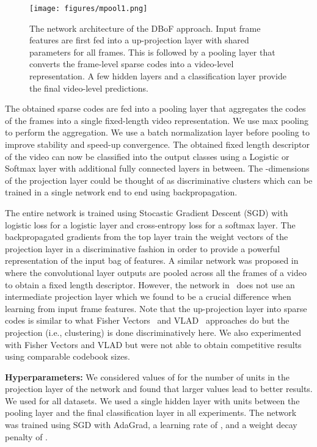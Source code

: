 \documentclass{sig-alternate-05-2015}
\begin{document}
\begin{figure}
\begin{center}
  \texttt{[image: figures/mpool1.png]}
  \caption{\small The network architecture of the DBoF approach. Input frame
  features are first fed into a up-projection layer with shared parameters for
  all frames. This is followed by a pooling layer that converts the frame-level
  sparse codes into a video-level representation. A few hidden layers and a
  classification layer provide the final video-level predictions.}
\label{fig:mpool}
\end{center}
\end{figure}

The obtained sparse codes are fed into a pooling layer that aggregates the codes
of the  frames into a single fixed-length video representation. We use max
pooling to perform the aggregation. We use a batch normalization layer before
pooling to improve stability and speed-up convergence. The obtained fixed length
descriptor of the video can now be classified into the output classes using a
Logistic or Softmax layer with additional fully connected layers in between. The
-dimensions of the projection layer could be thought of as  discriminative
clusters which can be trained in a single network end to end using backpropagation.

The entire network is trained using Stocastic Gradient Descent (SGD) with logistic loss for a logistic layer and cross-entropy loss for a softmax layer. The
backpropagated gradients from the top layer train the weight vectors of the projection layer in a discriminative fashion in order to provide a powerful
representation of the input bag of features. A similar network was proposed in~\cite{beyond} where the convolutional layer outputs are pooled across all the
frames of a video to obtain a fixed length descriptor. However, the network in~\cite{beyond} does not use an intermediate projection layer which we found
to be a crucial difference when learning from input frame features.
Note that the up-projection layer into sparse codes is similar to what Fisher
Vectors~\cite{fisher1} and VLAD~\cite{vlad} approaches do but the projection
(i.e., clustering) is done discriminatively here. We also experimented with
Fisher Vectors and VLAD but were not able to obtain competitive results using
comparable codebook sizes.

\textbf{Hyperparameters:} We considered values of  for the
number of units in the projection layer of the network and found that larger
values lead to better results. We used  for all datasets. We used a single
hidden layer with  units between the pooling layer and the final classification
layer in all experiments. The network was trained using SGD with AdaGrad, a
learning rate of , and a weight decay penalty of .
 
\end{document}
